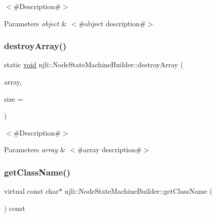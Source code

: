 $<$\#\+Description\#$>$


\begin{DoxyParams}{Parameters}
{\em object} & $<$\#object description\#$>$ \\
\hline
\end{DoxyParams}
\mbox{\label{classnjli_1_1_node_state_machine_builder_a71a0104d4850e419f9b06f3e6645475b}} 
\subsubsection{\texorpdfstring{destroy\+Array()}{destroyArray()}}
{\footnotesize\ttfamily static \mbox{\hyperlink{_thread_8h_af1e856da2e658414cb2456cb6f7ebc66}{void}} njli\+::\+Node\+State\+Machine\+Builder\+::destroy\+Array (\begin{DoxyParamCaption}\item[{\mbox{\hyperlink{classnjli_1_1_node_state_machine_builder}{Node\+State\+Machine\+Builder}} $\ast$$\ast$}]{array,  }\item[{const \mbox{\hyperlink{_util_8h_a10e94b422ef0c20dcdec20d31a1f5049}{u32}}}]{size = {} }\end{DoxyParamCaption})\hspace{0.3cm}{\ttfamily [static]}}

$<$\#\+Description\#$>$


\begin{DoxyParams}{Parameters}
{\em array} & $<$\#array description\#$>$ \\
\hline
\end{DoxyParams}
\mbox{\label{classnjli_1_1_node_state_machine_builder_ad1c1928bac8a1408c424dd5baf372a36}} 
\subsubsection{\texorpdfstring{get\+Class\+Name()}{getClassName()}}
{\footnotesize\ttfamily virtual const char$\ast$ njli\+::\+Node\+State\+Machine\+Builder\+::get\+Class\+Name (\begin{DoxyParamCaption}{ }\end{DoxyParamCaption}) const\hspace{0.3cm}{\ttfamily [virtual]}}

